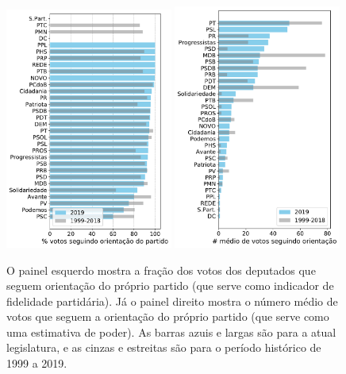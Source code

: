 \documentclass[12pt,a4paper]{article}
\begin{document}
\begin{figure}[H]
\centering
\includegraphics[width=0.49\textwidth]{graficos/fidelidade_partidaria_media_2019-05-08.pdf}
\includegraphics[width=0.49\textwidth]{graficos/poder_partidario_2019-05-08.pdf}
\caption{O painel esquerdo mostra a fração dos votos dos deputados que seguem orientação do próprio partido (que serve como indicador de fidelidade partidária). Já 
  o painel direito mostra o número médio de votos que seguem a orientação do próprio partido (que serve como uma estimativa de poder).
  As barras azuis e largas são para a atual legislatura, e as cinzas e estreitas são para o período
  histórico de 1999 a 2019.
}
\label{fig:fid-poder-partido}
\end{figure} 
\end{document}
